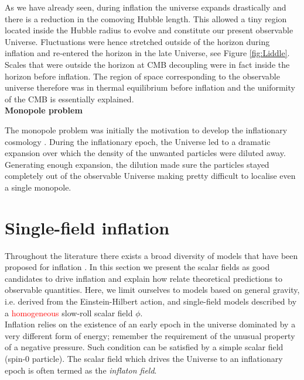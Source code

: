 \documentclass{rmaa}
\begin{document}
As we have already seen, during inflation the universe expands drastically and there is a 
reduction in the comoving Hubble length. This allowed a tiny region located inside the 
Hubble radius to evolve and constitute our present observable Universe. 
Fluctuations were hence stretched outside of the horizon during inflation and re-entered the horizon 
in the late Universe, see Figure \ref{fig:Liddle}. Scales that were outside the horizon at CMB decoupling 
were in fact inside the horizon before inflation. The region of space corresponding to the 
observable universe therefore was in thermal equilibrium before inflation and the uniformity 
of the CMB is essentially explained.
\\


\vskip 16pt
\noindent
\textbf{Monopole problem}
\vskip 6pt

The monopole problem was initially the motivation to develop the inflationary
cosmology \citep{Guth2}.
%
During the inflationary epoch, the Universe led to a dramatic expansion
over which the density of the unwanted particles were diluted away. Generating enough
expansion, the dilution made sure the particles stayed completely out of the observable Universe
making pretty difficult to localise even a single monopole.     





\section{Single-field inflation}
\vskip 6pt


Throughout the literature there exists a broad diversity of models that have been proposed for inflation 
\citep{LiddleLyth, Olive, Lyth}. In this section we present the scalar fields as good candidates 
to drive inflation and explain how relate theoretical predictions to observable quantities. 
Here, we limit ourselves to models based on general gravity, i.e. derived from the
Einstein-Hilbert action, and single-field models described by a \textcolor{red}{homogeneous} slow-roll scalar field $\phi$.
\\

Inflation relies on the existence of an early epoch in the universe dominated by a very 
different form of energy; remember the requirement of the unusual property of a negative 
pressure. Such condition can be satisfied by a simple scalar field (spin-0 particle). 
The scalar field which drives the Universe to an inflationary epoch is often termed 
as the \textit{inflaton field}. 
%
\end{document}
